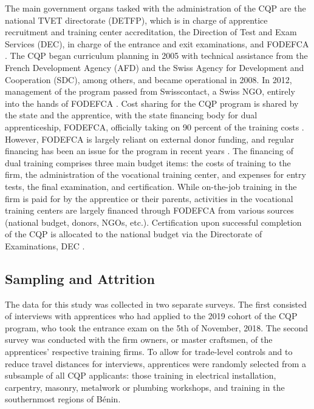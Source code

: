 \documentclass[
  a4paper, twoside, 12pt]{book}
\begin{document}
The main government organs tasked with the administration of the CQP are the national TVET directorate (DETFP), which is in charge of apprentice recruitment and training center accreditation, the Direction of Test and Exam Services (DEC), in charge of the entrance and exit examinations, and FODEFCA \autocite{nouatin2019}. The CQP began curriculum planning in 2005 with technical assistance from the French Development Agency (AFD) and the Swiss Agency for Development and Cooperation (SDC), among others, and became operational in 2008. In 2012, management of the program passed from Swisscontact, a Swiss NGO, entirely into the hands of FODEFCA \autocite{nouatin2019}. Cost sharing for the CQP program is shared by the state and the apprentice, with the state financing body for dual apprenticeship, FODEFCA, officially taking on 90 percent of the training costs \autocite{kofswisseconomicinstitute2017}. However, FODEFCA is largely reliant on external donor funding, and regular financing has been an issue for the program in recent years \autocite{david-gnahoui2017}. The financing of dual training comprises three main budget items: the costs of training to the firm, the administration of the vocational training center, and expenses for entry tests, the final examination, and certification. While on-the-job training in the firm is paid for by the apprentice or their parents, activities in the vocational training centers are largely financed through FODEFCA from various sources (national budget, donors, NGOs, etc.). Certification upon successful completion of the CQP is allocated to the national budget via the Directorate of Examinations, DEC \autocite{david-gnahoui2017}.

\hypertarget{sampling-and-attrition}{%
\subsection{Sampling and Attrition}\label{sampling-and-attrition}}

The data for this study was collected in two separate surveys. The first consisted of interviews with apprentices who had applied to the 2019 cohort of the CQP program, who took the entrance exam on the 5th of November, 2018. The second survey was conducted with the firm owners, or master craftsmen, of the apprentices' respective training firms. To allow for trade-level controls and to reduce travel distances for interviews, apprentices were randomly selected from a subsample of all CQP applicants: those training in electrical installation, carpentry, masonry, metalwork or plumbing workshops, and training in the southernmost regions of Bénin.
\end{document}
